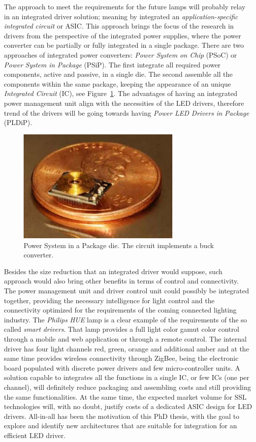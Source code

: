 The approach to meet the requirements for the future lamps will probably relay in an integrated driver solution; meaning by integrated an \emph{application-specific integrated circuit} or ASIC. This approach brings the focus of the research in drivers  from the perspective of the integrated power supplies, where the power converter can be partially or fully integrated in a single package. There are two approaches of integrated power converters: \emph{Power System on Chip} (PSoC) or  \emph{Power System in Package} (PSiP). The first integrate all required power components, active and passive, in a single die. The second assemble all the components within the same package, keeping the appearance of an unique \emph{Integrated Circuit} (IC), see Figure~\ref{fig:psoc_example}. The advantages of having an integrated power management unit align with the necessities of the LED drivers, therefore trend of the drivers will be going towards having \emph{Power LED Drivers in Package} (PLDiP).

\begin{figure}[!h]
    \centering
    \includegraphics[width=8cm]{./0_intro/img/FSolzbacher01.jpg}
    \caption{Power System in a Package die. The circuit implements a buck converter.}
    \label{fig:psoc_example}
\end{figure}

Besides the size reduction that an integrated driver would suppose, such approach would also bring other benefits in terms of control and connectivity.  The power management unit and driver control unit could possibly be integrated together, providing the necessary intelligence for light control and the connectivity optimized for the requirements of the coming connected lighting industry. The \emph{Philips} \emph{HUE} lamp is a clear example of the requirements of the so called \emph{smart drivers}. That lamp provides a full light color gamut color control through a mobile and web application or through a remote control. The internal driver has four light channels red, green, orange and additional amber and at the same time provides wireless connectivity through ZigBee, being the electronic board populated with discrete power drivers and few micro-controller units. A solution capable to integrates all the functions in a single IC, or few ICs (one per channel), will definitely reduce packaging and assembling costs and still providing the same functionalities. At the same time, the expected market volume for SSL technologies will, with no doubt,  justify costs of a dedicated ASIC design for LED drivers. All-in-all has been the motivation of this PhD thesis, with  the goal to explore and identify new architectures that are suitable for integration for an efficient LED driver.


